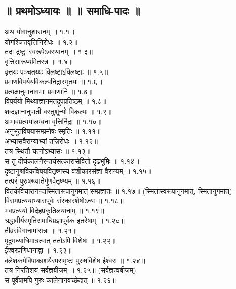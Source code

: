 \begin{multicols}{2}

\section*{॥ प्रथमोऽध्यायः ॥  ॥ समाधि-पादः ॥}
\begin{flushleft}
\devanagarifont
अथ योगानुशासनम् ॥ १.१॥\\
योगश्चित्तवृत्तिनिरोधः ॥ १.२॥\\
तदा द्रष्टुः स्वरूपेऽवस्थानम् ॥ १.३॥\\
वृत्तिसारूप्यमितरत्र ॥ १.४॥\\
वृत्तयः पञ्चतय्यः क्लिष्टाऽक्लिष्टाः ॥ १.५॥\\
प्रमाणविपर्ययविकल्पनिद्रास्मृतयः ॥ १.६॥\\
प्रत्यक्षानुमानागमाः प्रमाणानि ॥ १.७॥\\
विपर्ययो मिथ्याज्ञानमतद्रूपप्रतिष्ठम् ॥ १.८॥\\
शब्दज्ञानानुपाती वस्तुशून्यो विकल्पः ॥ १.९॥\\
अभावप्रत्ययालम्बना वृत्तिर्निद्रा ॥ १.१०॥\\
अनुभूतविषयासम्प्रमोषः स्मृतिः ॥ १.११॥\\
अभ्यासवैराग्याभ्यां तन्निरोधः ॥ १.१२॥\\
तत्र स्थितौ यत्नोऽभ्यासः ॥ १.१३॥\\
स तु दीर्घकालनैरन्तर्यसत्कारासेवितो दृढभूमिः ॥ १.१४॥\\
दृष्टानुश्रविकविषयवितृष्णस्य वशीकारसंज्ञा वैराग्यम् ॥ १.१५॥\\
तत्परं पुरुषख्यातेर्गुणवैतृष्ण्यम् ॥ १.१६॥\\
वितर्कविचारानन्दास्मितारूपानुगमात् सम्प्रज्ञातः ॥ १.१७॥ (स्मितास्वरूपानुगमात्, स्मितानुगमात्) \\
विरामप्रत्ययाभ्यासपूर्वः संस्कारशेषोऽन्यः ॥ १.१८॥\\
भवप्रत्ययो विदेहप्रकृतिलयानाम् ॥ १.१९॥\\
श्रद्धावीर्यस्मृतिसमाधिप्रज्ञापूर्वक इतरेषाम् ॥ १.२०॥\\
तीव्रसंवेगानामासन्नः ॥ १.२१॥\\
मृदुमध्याधिमात्रत्वात् ततोऽपि विशेषः ॥ १.२२॥\\
ईश्वरप्रणिधानाद्वा ॥ १.२३॥\\
क्लेशकर्मविपाकाशयैरपरामृष्टः पुरुषविशेष ईश्वरः ॥ १.२४॥\\
तत्र निरतिशयं सर्वज्ञबीजम् ॥ १.२५॥ (सर्वज्ञत्वबीजम्) \\
स पूर्वेषामपि गुरुः कालेनानवच्छेदात् ॥ १.२६॥\\

\end{flushleft}
\end{multicols}
